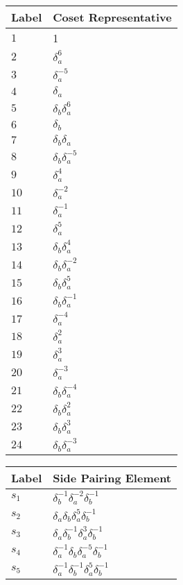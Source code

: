 \documentclass{article}
\begin{document}

\begin{center}
\begin{tabular}{ll}
\toprule
Label & Coset Representative\\
\midrule
$1$ & 1 \\
$2$ & $\delta_a^{6}$ \\
$3$ & $\delta_a^{-5}$ \\
$4$ & $\delta_a^{}$ \\
$5$ & $\delta_b^{}\delta_a^{6}$ \\
$6$ & $\delta_b^{}$ \\
$7$ & $\delta_b^{}\delta_a^{}$ \\
$8$ & $\delta_b^{}\delta_a^{-5}$ \\
$9$ & $\delta_a^{4}$ \\
$10$ & $\delta_a^{-2}$ \\
$11$ & $\delta_a^{-1}$ \\
$12$ & $\delta_a^{5}$ \\
$13$ & $\delta_b^{}\delta_a^{4}$ \\
$14$ & $\delta_b^{}\delta_a^{-2}$ \\
$15$ & $\delta_b^{}\delta_a^{5}$ \\
$16$ & $\delta_b^{}\delta_a^{-1}$ \\
$17$ & $\delta_a^{-4}$ \\
$18$ & $\delta_a^{2}$ \\
$19$ & $\delta_a^{3}$ \\
$20$ & $\delta_a^{-3}$ \\
$21$ & $\delta_b^{}\delta_a^{-4}$ \\
$22$ & $\delta_b^{}\delta_a^{2}$ \\
$23$ & $\delta_b^{}\delta_a^{3}$ \\
$24$ & $\delta_b^{}\delta_a^{-3}$ \\
\bottomrule
\end{tabular}
\hfill
\begin{tabular}{ll}
\toprule
Label & Side Pairing Element\\
\midrule
$s_{1}$ & $\delta_b^{-1}\delta_a^{-2}\delta_b^{-1}$ \\
$s_{2}$ & $\delta_a^{}\delta_b^{}\delta_a^{5}\delta_b^{-1}$ \\
$s_{3}$ & $\delta_a^{}\delta_b^{-1}\delta_a^{3}\delta_b^{-1}$ \\
$s_{4}$ & $\delta_a^{-1}\delta_b^{}\delta_a^{-5}\delta_b^{-1}$ \\
$s_{5}$ & $\delta_a^{-1}\delta_b^{-1}\delta_a^{5}\delta_b^{-1}$ \\

\end{tabular}
\end{center}
\end{document}
